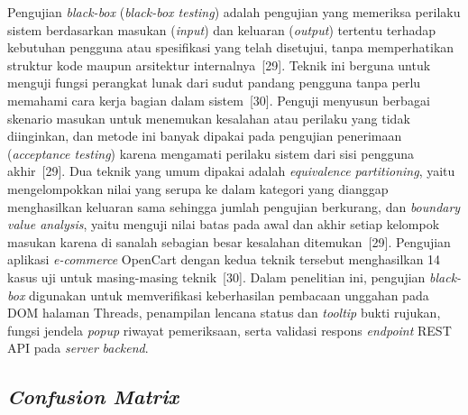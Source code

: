 \documentclass[12pt,a4paper,twoside]{report}
\begin{document}
Pengujian \textit{black-box} (\textit{black-box testing}) adalah pengujian yang memeriksa perilaku sistem berdasarkan masukan (\textit{input}) dan keluaran (\textit{output}) tertentu terhadap kebutuhan pengguna atau spesifikasi yang telah disetujui, tanpa memperhatikan struktur kode maupun arsitektur internalnya~[29]. Teknik ini berguna untuk menguji fungsi perangkat lunak dari sudut pandang pengguna tanpa perlu memahami cara kerja bagian dalam sistem~[30]. Penguji menyusun berbagai skenario masukan untuk menemukan kesalahan atau perilaku yang tidak diinginkan, dan metode ini banyak dipakai pada pengujian penerimaan (\textit{acceptance testing}) karena mengamati perilaku sistem dari sisi pengguna akhir~[29]. Dua teknik yang umum dipakai adalah \textit{equivalence partitioning}, yaitu mengelompokkan nilai yang serupa ke dalam kategori yang dianggap menghasilkan keluaran sama sehingga jumlah pengujian berkurang, dan \textit{boundary value analysis}, yaitu menguji nilai batas pada awal dan akhir setiap kelompok masukan karena di sanalah sebagian besar kesalahan ditemukan~[29]. Pengujian aplikasi \textit{e-commerce} OpenCart dengan kedua teknik tersebut menghasilkan 14 kasus uji untuk masing-masing teknik~[30]. Dalam penelitian ini, pengujian \textit{black-box} digunakan untuk memverifikasi keberhasilan pembacaan unggahan pada DOM halaman Threads, penampilan lencana status dan \textit{tooltip} bukti rujukan, fungsi jendela \textit{popup} riwayat pemeriksaan, serta validasi respons \textit{endpoint} REST API pada \textit{server} \textit{backend}.

\subsection{\textit{Confusion Matrix}}
\end{document}
